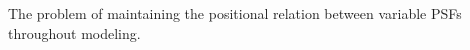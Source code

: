 The problem of maintaining the positional relation between variable PSFs throughout
modeling.
\label{fig:ast_theory_psf}